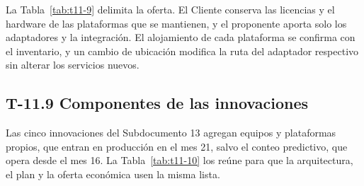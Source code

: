\documentclass[11pt]{article}
\begin{document}
La Tabla~\mbox{\ref{tab:t11-9}} delimita la oferta. El Cliente conserva las licencias y el hardware de las plataformas que se mantienen, y el proponente aporta solo los adaptadores y la integración. El alojamiento de cada plataforma se confirma con el inventario, y un cambio de ubicación modifica la ruta del adaptador respectivo sin alterar los servicios nuevos.

\subsection{T-11.9 Componentes de las innovaciones}\label{t-11-9}

Las cinco innovaciones del Subdocumento 13 agregan equipos y plataformas propios, que entran en producción en el mes 21, salvo el conteo predictivo, que opera desde el mes 16. La Tabla~\mbox{\ref{tab:t11-10}} los reúne para que la arquitectura, el plan y la oferta económica usen la misma lista.
\end{document}
